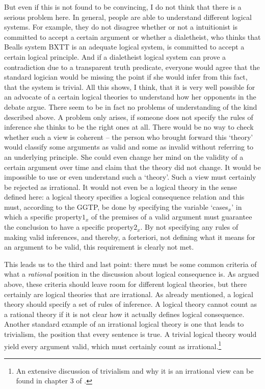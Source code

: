 \documentclass{article}
\begin{document}
But even if this is not found to be convincing, I do not think that there is a serious problem here. In general, people are able to understand different logical systems. For example, they do not disagree whether or not a intuitionist is committed to accept a certain argument or whether a dialetheist, who thinks that Bealls system BXTT is an adequate logical system, is committed to accept a certain logical principle. And if a dialetheist logical system can prove a contradiction due to a transparent truth predicate, everyone would agree that the standard logician would be missing the point if she would infer from this fact, that the system is trivial. All this shows, I think, that it is very well possible for an advocate of a certain logical theories to understand how her opponents in the debate argue. There seem to be in fact no problems of understanding of the kind described above. A problem only arises, if someone does not specify the rules of inference she thinks to be the right ones at all. There would be no way to check whether such a view is coherent -- the person who brought forward this `theory' would classify some arguments as valid and some as invalid without referring to an underlying principle. She could even change her mind on the validity of a certain argument over time and claim that the theory did not change. It would be impossible to use or even understand such a `theory'. Such a view must certainly be rejected as irrational. It would not even be a logical theory in the sense defined here: a logical theory specifies a logical consequence relation and this must, according to the GGTP, be done by specifying the variable `cases$_x$' in which a specific property$1_x$ of the premises of a valid argument must guarantee the conclusion to have a specific property$2_x$. By not specifying any rules of making valid inferences, and thereby, a forteriori, not defining what it means for an argument to be valid, this requirement is clearly not met.

This leads us to the third and last point: there must be some common criteria of what a \textit{rational} position in the discussion about logical consequence is. As argued above, these criteria should leave room for different logical theories, but there certainly are logical theories that are irrational. As already mentioned, a logical theory should specify a set of rules of inference. A logical theory cannot count as a rational theory if it is not clear how it actually defines logical consequence. Another standard example of an irrational logical theory is one that leads to trivialism, the position that every sentence is true. A trivial logical theory would yield every argument valid, which must certainly count as irrational.\footnote{An extensive discussion of trivialism and why it is an irrational view can be found in chapter 3 of .}
\end{document}
